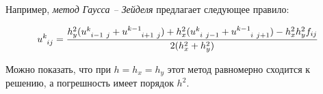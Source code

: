 \documentclass[__main__.tex]{subfiles}
\begin{document}
Например, \textit{метод Гаусса -- Зейделя} предлагает следующее правило:

$$
u\indices{^k_i_j}
=
\frac{
h_y^2(u\indices{^k_{i-1\ }_j} + u\indices{^{k-1}_{i+1\ }_j})
+
h_x^2(u\indices{^k_{i\ }_{j-1}} + u\indices{^{k-1}_{i\ }_{j+1}})
-
h_x^2h_y^2f_{ij}}{2(h_x^2+h_y^2)}
$$

Можно показать, что при $h=h_x=h_y$ этот метод равномерно сходится к решению, а погрешность имеет порядок $h^2$.
\end{document}

